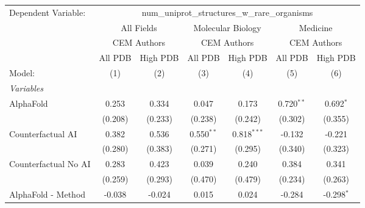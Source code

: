 \begingroup
\centering
\begin{tabular}{lcccccc}
   \tabularnewline \midrule \midrule
   Dependent Variable: & \multicolumn{6}{c}{num\_uniprot\_structures\_w\_rare\_organisms}\\
 & \multicolumn{2}{c}{All Fields} & \multicolumn{2}{c}{Molecular Biology} & \multicolumn{2}{c}{Medicine} \\
\cmidrule(lr){2-3} \cmidrule(lr){4-5} \cmidrule(lr){6-7}
 & \multicolumn{2}{c}{CEM Authors} & \multicolumn{2}{c}{CEM Authors} & \multicolumn{2}{c}{CEM Authors} \\
\cmidrule(lr){2-3} \cmidrule(lr){4-5} \cmidrule(lr){6-7}
 & \multicolumn{1}{c}{All PDB} & \multicolumn{1}{c}{High PDB} & \multicolumn{1}{c}{All PDB} & \multicolumn{1}{c}{High PDB} & \multicolumn{1}{c}{All PDB} & \multicolumn{1}{c}{High PDB} \\
\cmidrule(lr){2-2} \cmidrule(lr){3-3} \cmidrule(lr){4-4} \cmidrule(lr){5-5} \cmidrule(lr){6-6} \cmidrule(lr){7-7}
   Model:                                                     & (1)           & (2)           & (3)           & (4)           & (5)           & (6)\\  
   \midrule
   \emph{Variables}\\
   AlphaFold                                                  & 0.253         & 0.334         & 0.047         & 0.173         & 0.720$^{**}$  & 0.692$^{*}$\\   
                                                              & (0.208)       & (0.233)       & (0.238)       & (0.242)       & (0.302)       & (0.355)\\   
   Counterfactual AI                                          & 0.382         & 0.536         & 0.550$^{**}$  & 0.818$^{***}$ & -0.132        & -0.221\\   
                                                              & (0.280)       & (0.383)       & (0.271)       & (0.295)       & (0.340)       & (0.323)\\   
   Counterfactual No AI                                       & 0.283         & 0.423         & 0.039         & 0.240         & 0.384         & 0.341\\   
                                                              & (0.259)       & (0.293)       & (0.470)       & (0.479)       & (0.234)       & (0.263)\\   
   AlphaFold - Method                                         & -0.038        & -0.024        & 0.015         & 0.024         & -0.284        & -0.298$^{*}$\\   

\end{tabular}
